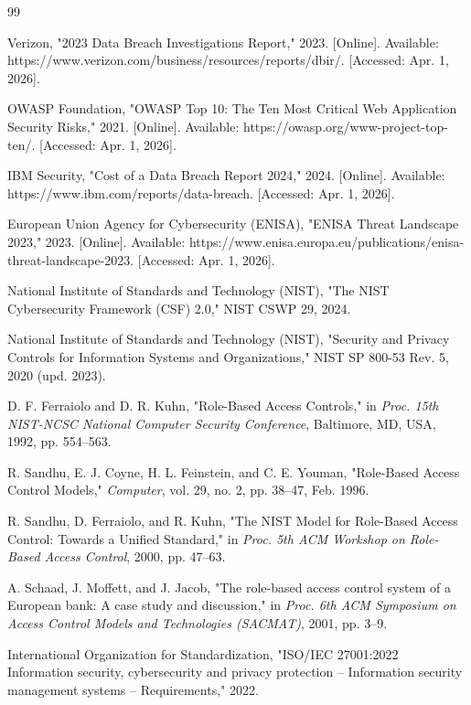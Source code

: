 \documentclass[conference]{IEEEtran}
\begin{document}

\begin{thebibliography}{99}


Verizon, "2023 Data Breach Investigations Report," 2023. [Online]. Available: https://www.verizon.com/business/resources/reports/dbir/. [Accessed: Apr. 1, 2026].

OWASP Foundation, "OWASP Top 10: The Ten Most Critical Web Application Security Risks," 2021. [Online]. Available: https://owasp.org/www-project-top-ten/. [Accessed: Apr. 1, 2026].

IBM Security, "Cost of a Data Breach Report 2024," 2024. [Online]. Available: https://www.ibm.com/reports/data-breach. [Accessed: Apr. 1, 2026].

European Union Agency for Cybersecurity (ENISA), "ENISA Threat Landscape 2023," 2023. [Online]. Available: https://www.enisa.europa.eu/publications/enisa-threat-landscape-2023. [Accessed: Apr. 1, 2026].

National Institute of Standards and Technology (NIST), "The NIST Cybersecurity Framework (CSF) 2.0," NIST CSWP 29, 2024.

National Institute of Standards and Technology (NIST), "Security and Privacy Controls for Information Systems and Organizations," NIST SP 800-53 Rev. 5, 2020 (upd. 2023).

D. F. Ferraiolo and D. R. Kuhn, "Role-Based Access Controls," in \textit{Proc. 15th NIST-NCSC National Computer Security Conference}, Baltimore, MD, USA, 1992, pp. 554--563.

R. Sandhu, E. J. Coyne, H. L. Feinstein, and C. E. Youman, "Role-Based Access Control Models," \textit{Computer}, vol. 29, no. 2, pp. 38--47, Feb. 1996.

R. Sandhu, D. Ferraiolo, and R. Kuhn, "The NIST Model for Role-Based Access Control: Towards a Unified Standard," in \textit{Proc. 5th ACM Workshop on Role-Based Access Control}, 2000, pp. 47--63.

A. Schaad, J. Moffett, and J. Jacob, "The role-based access control system of a European bank: A case study and discussion," in \textit{Proc. 6th ACM Symposium on Access Control Models and Technologies (SACMAT)}, 2001, pp. 3--9.

International Organization for Standardization, "ISO/IEC 27001:2022 Information security, cybersecurity and privacy protection -- Information security management systems -- Requirements," 2022.

\end{thebibliography}
\end{document}
